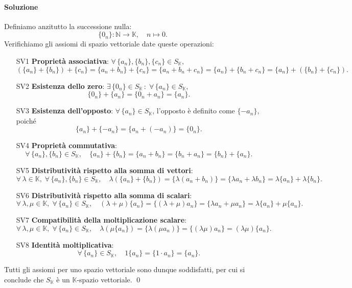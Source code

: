 \documentclass{article}
\theoremstyle{plain}
\theoremstyle{definition}
\theoremstyle{remark}
\begin{document}
\paragraph{Soluzione}
Definiamo anzitutto la successione nulla: 
\[\{0_n\}:\mathbb{N}\to\mathbb{K},\quad n\mapsto 0.\]
Verifichiamo gli assiomi di spazio vettoriale date queste operazioni:
\begin{itemize}
    \item[SV1] \textbf{Proprietà associativa}: $\forall\,\{a_n\},\{b_n\},\{c_n\}\in S_\mathbb{K},$
    \[
    (\{a_n\} + \{b_n\}) + \{c_n\} = \{a_n + b_n\} + \{c_n\} = \{a_n + b_n + c_n\} = \{a_n\} + \{b_n + c_n\} = \{a_n\} + (\{b_n\} + \{c_n\}).
    \]
    
    \item[SV2] \textbf{Esistenza dello zero}: $\exists\,\{0_n\} \in S_\mathbb{K}\,:\;\forall\,\{a_n\}\in S_\mathbb{K},$
    \[
    \{0_n\} + \{a_n\} = \{0_n + a_n\} = \{a_n\}.
    \]
    
    \item[SV3] \textbf{Esistenza dell'opposto}: $\forall\,\{a_n\}\in S_\mathbb{K}$, l'opposto è definito come $\{-a_n\}$, poiché
    \[
    \{a_n\} + \{-a_n\} = \{a_n + (-a_n)\} = \{0_n\}.
    \]
    
    \item[SV4] \textbf{Proprietà commutativa}: 
    \[
    \forall\,\{a_n\},\{b_n\}\in S_\mathbb{K},\quad \{a_n\} + \{b_n\} = \{a_n + b_n\} = \{b_n + a_n\} = \{b_n\} + \{a_n\}.
    \]
    
    \item[SV5] \textbf{Distributività rispetto alla somma di vettori}: 
    \[
    \forall\,\lambda\in\mathbb{K},\;\forall\,\{a_n\},\{b_n\}\in S_\mathbb{K},\quad \lambda(\{a_n\}+\{b_n\}) = \{\lambda (a_n+b_n)\} = \{\lambda a_n+\lambda b_n\} = \lambda\{a_n\}+\lambda\{b_n\}.
    \]
    
    \item[SV6] \textbf{Distributività rispetto alla somma di scalari}: 
    \[
    \forall\,\lambda,\mu\in\mathbb{K},\;\forall\,\{a_n\}\in S_\mathbb{K},\quad (\lambda+\mu)\{a_n\} = \{(\lambda+\mu)a_n\} = \{\lambda a_n+\mu a_n\} = \lambda\{a_n\}+\mu\{a_n\}.
    \]
    
    \item[SV7] \textbf{Compatibilità della moltiplicazione scalare}: 
    \[
    \forall\,\lambda,\mu\in\mathbb{K},\;\forall\,\{a_n\}\in S_\mathbb{K},\quad \lambda(\mu\{a_n\}) = \{\lambda(\mu a_n)\} = \{(\lambda\mu)a_n\} = (\lambda\mu)\{a_n\}.
    \]
    
    \item[SV8] \textbf{Identità moltiplicativa}: 
    \[
    \forall\,\{a_n\}\in S_\mathbb{K},\quad 1\{a_n\} = \{1\cdot a_n\} = \{a_n\}.
    \]
\end{itemize}
Tutti gli assiomi per uno spazio vettoriale sono dunque soddisfatti, per cui si conclude che $S_\mathbb{K}$ è un $\mathbb{K}$-spazio vettoriale. \qed
\end{document}
